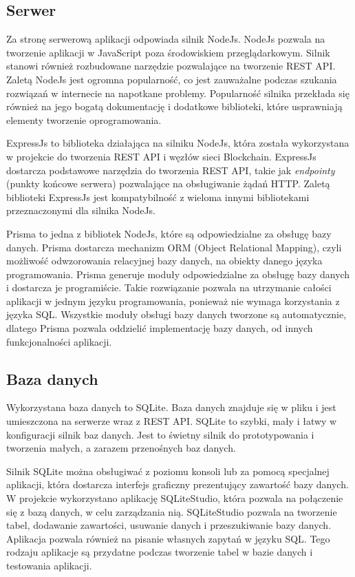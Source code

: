 \documentclass[a4paper,12pt]{book}
\begin{document}
\subsection{Serwer}
Za stronę serwerową aplikacji odpowiada silnik NodeJs. NodeJs pozwala na tworzenie aplikacji w JavaScript poza środowiskiem przeglądarkowym. Silnik stanowi również rozbudowane narzędzie pozwalające na tworzenie REST API. Zaletą NodeJs jest ogromna popularność, co jest zauważalne podczas szukania rozwiązań w internecie na napotkane problemy. Popularność silnika przekłada się również na jego bogatą dokumentację i dodatkowe biblioteki, które usprawniają elementy tworzenie oprogramowania.

ExpressJs to biblioteka działająca na silniku NodeJs, która została wykorzystana w projekcie do tworzenia REST API i węzłów sieci Blockchain. ExpressJs dostarcza podstawowe narzędzia do tworzenia REST API, takie jak \textit{endpointy} (punkty końcowe serwera) pozwalające na obsługiwanie żądań HTTP. Zaletą biblioteki ExpressJs jest kompatybilność z wieloma innymi bibliotekami przeznaczonymi dla silnika NodeJs.

Prisma to jedna z bibliotek NodeJs, które są odpowiedzialne za obsługę bazy danych. Prisma dostarcza mechanizm ORM (Object Relational Mapping), czyli możliwość odwzorowania relacyjnej bazy danych, na obiekty danego języka programowania. Prisma generuje moduły odpowiedzialne za obsługę bazy danych i dostarcza je programiście. Takie rozwiązanie pozwala na utrzymanie całości aplikacji w jednym języku programowania, ponieważ nie wymaga korzystania z języka SQL. Wszystkie moduły obsługi bazy danych tworzone są automatycznie, dlatego Prisma pozwala oddzielić implementację bazy danych, od innych funkcjonalności aplikacji.

\subsection {Baza danych}

Wykorzystana baza danych to SQLite. Baza danych znajduje się w pliku i jest umieszczona na serwerze wraz z REST API. SQLite to szybki, mały i łatwy w konfiguracji silnik baz danych. Jest to świetny silnik do prototypowania i tworzenia małych, a zarazem przenośnych baz danych.

Silnik SQLite można obsługiwać z poziomu konsoli lub za pomocą specjalnej aplikacji, która dostarcza interfejs graficzny prezentujący zawartość bazy danych. W projekcie wykorzystano aplikację SQLiteStudio, która pozwala na połączenie się z bazą danych, w celu zarządzania nią. SQLiteStudio pozwala na tworzenie tabel, dodawanie zawartości, usuwanie danych i przeszukiwanie bazy danych. Aplikacja pozwala również na pisanie własnych zapytań w języku SQL. Tego rodzaju aplikacje są przydatne podczas tworzenie tabel w bazie danych i testowania aplikacji.
\end{document}
